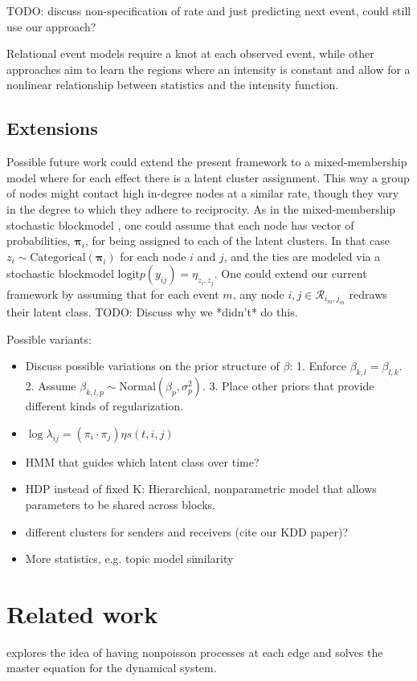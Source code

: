 \documentclass[11pt]{article}
\begin{document}
TODO: discuss non-specification of rate and just predicting next
event, could still use our approach?

Relational event models \cite{Butts2008} require a knot at each observed event, while other approaches \cite{Gunawardana2011} aim to learn the regions where an intensity is constant and allow for a nonlinear relationship between statistics and the intensity function.  

\subsection{Extensions}
Possible future work could extend the present framework to a mixed-membership model where for each effect there is a latent cluster assignment.  This way a group of nodes might contact high in-degree nodes at a similar rate, though they vary in the degree to which they adhere to reciprocity.  As in the mixed-membership stochastic blockmodel \cite{Airoldi2008,Shafiei2010}, one could assume that each node has vector of probabilities, $\boldsymbol{\pi}_i$, for being assigned to each of the latent clusters.  In that case $z_i \sim \mbox{Categorical}(\boldsymbol{\pi}_i)$ for each node $i$ and $j$, and the ties are modeled via a stochastic blockmodel $\mbox{logit} p(y_{ij}) = \eta_{z_i,z_j}$.  One could extend our current framework by assuming that for each event $m$, any node  $i,j \in \mathcal{R}_{i_m,j_m}$ redraws their latent class.  TODO: Discuss why we *didn't* do this.

Possible variants:
\begin{itemize}
\item Discuss possible variations on the prior structure of $\beta$: 1. Enforce $\beta_{k,l} = \beta_{l,k}$. 2. Assume $\beta_{k,l,p} \sim \mbox{Normal}(\beta_p,\sigma_p^2)$. 3. Place other priors that provide different kinds of regularization. 
\item $\log \lambda_{ij} = (\pi_i \cdot \pi_j) \eta s(t,i,j)$
\item  HMM that guides which latent class over time?
\item  HDP instead of fixed K: Hierarchical, nonparametric model that allows parameters to be shared across blocks.
\item different clusters for senders and receivers (cite our KDD paper)?
\item More statistics, e.g. topic model similarity
\end{itemize}

\section{Related work}
\cite{Tillman2011} explores the idea of having nonpoisson processes at each edge and solves the master equation for the dynamical system.
\end{document}
